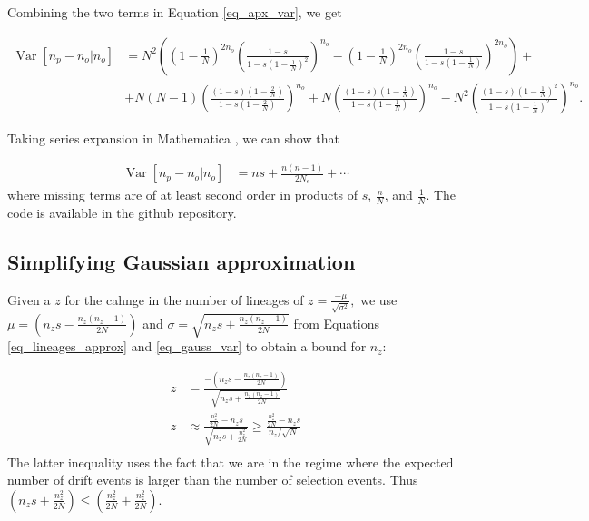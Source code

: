 \documentclass[review,nonatbib]{elsarticle}
\begin{document}
Combining the two terms in Equation \eqref{eq_apx_var}, we get

\newcommand{\vara}[1]{\left(1-\frac{#1}{N}\right)}
\newcommand{\varb}[1]{\left(\frac{1-s}{1-s #1}\right)}

\begin{equation}
  \begin{aligned}
    \operatorname{Var}[n_p-n_o | n_o] &=
    N^2\left( \vara{1}^{2n_o}\varb{\vara{1}^2}^{n_o}-\vara{1}^{2n_o}\varb{\vara{1}}^{2n_o} \right) + \\
    &+ N (N-1) \left( \frac{ (1-s)\left( 1-\frac{2}{N} \right) }{ 1-s\left( 1-\frac{2}{N} \right) } \right)^{n_o} + N \left( \frac{(1-s)\left( 1-\frac{1}{N} \right)}{1-s\left( 1-\frac{1}{N} \right)}\right)^{n_o} - N^2 \left( \frac{(1-s)\left( 1-\frac{1}{N} \right)^2}{1-s\left( 1-\frac{1}{N} \right)^2}\right)^{n_o}.
    \label{eq_exact_var}
  \end{aligned}
\end{equation}

Taking series expansion in Mathematica \citep{Mathematica}, we can show that

\begin{equation}
  \begin{aligned}
    \operatorname{Var}[n_p-n_o | n_o] &= n s + \frac{n (n-1)}{2 N_e}  + \cdots
    \label{eq_exact_var}
  \end{aligned}
\end{equation}
where missing terms are of at least second order in products of  $s$, $\frac{n}{N}$,  and
$\frac{1}{N}.$ The code is available in the github repository.

\subsection{Simplifying Gaussian approximation}
\label{subsec_apx_gauss}
Given a $z$ for the cahnge in the number of lineages of $ z = \frac{-\mu}{\sqrt{\sigma^2}},$ 
we use $\mu=\left(  n_zs - \frac{n_z(n_z-1)}{2N} \right)$ and $\sigma = \sqrt{n_zs +
\frac{n_z(n_z-1)}{2N}}$ from Equations \ref{eq_lineages_approx} and \ref{eq_gauss_var} to obtain a bound for $n_z$: 


\begin{equation}
\begin{aligned}
  z &= \frac{-\left(  n_zs - \frac{n_z(n_z-1)}{2N} \right)}	{\sqrt{n_zs + \frac{n_z(n_z-1)}{2N}}} \\
  z &\approx \frac{\frac{n_z^2}{2N} - n_z s}	{\sqrt{n_zs + \frac{n_z^2}{2N}}} \geq \frac{\frac{n_z^2}{2N} - n_z s}{n_z / \sqrt{N}} \\
 \end{aligned}
\end{equation}
 The latter inequality uses the fact that we are in the regime where the expected number of drift events is larger than the number of 
 selection events. Thus $\left(n_zs +
\frac{n_z^2}{2N} \right) \leq \left(\frac{n_z^2}{2N} + \frac{n_z^2}{2N} \right)$.
 
\end{document}
